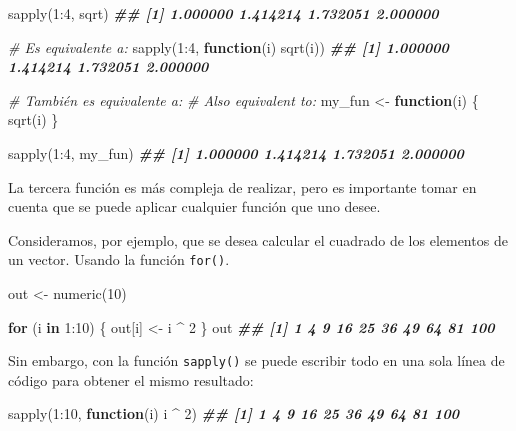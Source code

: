 \documentclass[
]{book}
\newenvironment{Shaded}{\begin{snugshade}}{\end{snugshade}}
\newcommand{\CommentTok}[1]{\textcolor[rgb]{0.56,0.35,0.01}{\textit{#1}}}
\newcommand{\ControlFlowTok}[1]{\textcolor[rgb]{0.13,0.29,0.53}{\textbf{#1}}}
\newcommand{\DecValTok}[1]{\textcolor[rgb]{0.00,0.00,0.81}{#1}}
\newcommand{\DocumentationTok}[1]{\textcolor[rgb]{0.56,0.35,0.01}{\textbf{\textit{#1}}}}
\newcommand{\FunctionTok}[1]{\textcolor[rgb]{0.00,0.00,0.00}{#1}}
\newcommand{\NormalTok}[1]{#1}
\newcommand{\OtherTok}[1]{\textcolor[rgb]{0.56,0.35,0.01}{#1}}
\newcommand{\SpecialCharTok}[1]{\textcolor[rgb]{0.00,0.00,0.00}{#1}}
\begin{document}
\begin{Shaded}
\begin{Highlighting}[]
\FunctionTok{sapply}\NormalTok{(}\DecValTok{1}\SpecialCharTok{:}\DecValTok{4}\NormalTok{, sqrt) }
\DocumentationTok{\#\# [1] 1.000000 1.414214 1.732051 2.000000}

\CommentTok{\# Es equivalente a:}
\FunctionTok{sapply}\NormalTok{(}\DecValTok{1}\SpecialCharTok{:}\DecValTok{4}\NormalTok{, }\ControlFlowTok{function}\NormalTok{(i) }\FunctionTok{sqrt}\NormalTok{(i))  }
\DocumentationTok{\#\# [1] 1.000000 1.414214 1.732051 2.000000}

\CommentTok{\# También es equivalente a: }
\CommentTok{\# Also equivalent to:}
\NormalTok{my\_fun }\OtherTok{\textless{}{-}} \ControlFlowTok{function}\NormalTok{(i) \{}
    \FunctionTok{sqrt}\NormalTok{(i)}
\NormalTok{\}}

\FunctionTok{sapply}\NormalTok{(}\DecValTok{1}\SpecialCharTok{:}\DecValTok{4}\NormalTok{, my\_fun) }
\DocumentationTok{\#\# [1] 1.000000 1.414214 1.732051 2.000000}
\end{Highlighting}
\end{Shaded}

La tercera función es más compleja de realizar, pero es importante tomar en cuenta que se puede aplicar cualquier función que uno desee.

Consideramos, por ejemplo, que se desea calcular el cuadrado de los elementos de un vector. Usando la función \texttt{for()}.

\begin{Shaded}
\begin{Highlighting}[]
\NormalTok{out }\OtherTok{\textless{}{-}} \FunctionTok{numeric}\NormalTok{(}\DecValTok{10}\NormalTok{)}

\ControlFlowTok{for}\NormalTok{ (i }\ControlFlowTok{in} \DecValTok{1}\SpecialCharTok{:}\DecValTok{10}\NormalTok{) \{}
\NormalTok{    out[i] }\OtherTok{\textless{}{-}}\NormalTok{ i }\SpecialCharTok{\^{}} \DecValTok{2}
\NormalTok{\}}
\NormalTok{out}
\DocumentationTok{\#\#  [1]   1   4   9  16  25  36  49  64  81 100}
\end{Highlighting}
\end{Shaded}

Sin embargo, con la función \texttt{sapply()} se puede escribir todo en una sola línea de código para obtener el mismo resultado:

\begin{Shaded}
\begin{Highlighting}[]
\FunctionTok{sapply}\NormalTok{(}\DecValTok{1}\SpecialCharTok{:}\DecValTok{10}\NormalTok{, }\ControlFlowTok{function}\NormalTok{(i) i }\SpecialCharTok{\^{}} \DecValTok{2}\NormalTok{)}
\DocumentationTok{\#\#  [1]   1   4   9  16  25  36  49  64  81 100}
\end{Highlighting}
\end{Shaded}
\end{document}
